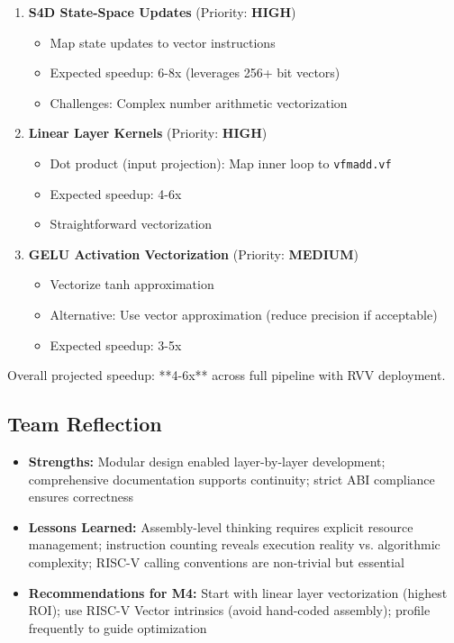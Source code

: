 \documentclass[conference]{IEEEtran}
\begin{document}
\begin{enumerate}
    \item \textbf{S4D State-Space Updates} (Priority: \textbf{HIGH})
    \begin{itemize}
        \item Map state updates to vector instructions
        \item Expected speedup: 6-8x (leverages 256+ bit vectors)
        \item Challenges: Complex number arithmetic vectorization
    \end{itemize}
    
    \item \textbf{Linear Layer Kernels} (Priority: \textbf{HIGH})
    \begin{itemize}
        \item Dot product (input projection): Map inner loop to \texttt{vfmadd.vf}
        \item Expected speedup: 4-6x
        \item Straightforward vectorization
    \end{itemize}
    
    \item \textbf{GELU Activation Vectorization} (Priority: \textbf{MEDIUM})
    \begin{itemize}
        \item Vectorize tanh approximation
        \item Alternative: Use vector approximation (reduce precision if acceptable)
        \item Expected speedup: 3-5x
    \end{itemize}
\end{enumerate}

Overall projected speedup: **4-6x** across full pipeline with RVV deployment.

\subsection{Team Reflection}

\begin{itemize}
    \item \textbf{Strengths:} Modular design enabled layer-by-layer development; comprehensive documentation supports continuity; strict ABI compliance ensures correctness
    \item \textbf{Lessons Learned:} Assembly-level thinking requires explicit resource management; instruction counting reveals execution reality vs. algorithmic complexity; RISC-V calling conventions are non-trivial but essential
    \item \textbf{Recommendations for M4:} Start with linear layer vectorization (highest ROI); use RISC-V Vector intrinsics (avoid hand-coded assembly); profile frequently to guide optimization
\end{itemize}
\end{document}
